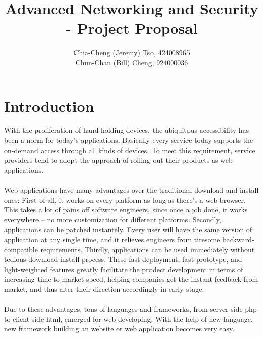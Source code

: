 \documentclass[12pt, a4paper]{article}
\title{
    Advanced Networking and Security\\
    - Project Proposal
    \vspace{-2ex}
}
\author{
    \normalfont \normalsize 
    Chia-Cheng (Jeremy) Tso, 
    424008965\\
    \vspace{-5ex}
    \normalfont \normalsize 
    Chun-Chan (Bill) Cheng, 
    924000036
    \vspace{-5ex}
}
\date{
    \normalfont \normalsize 
    \vspace{-9ex}
}
\begin{document}
\maketitle
%

\section{Introduction}
With the proliferation of hand-holding devices,
the ubiquitous accessibility has been a norm for today's applications.
Basically every service today supports the on-demand access through all kinds of devices.
To meet this requirement, service providers tend to adopt the approach of rolling
out their products as
web applications.
\\\\
Web applications have many advantages over the traditional download-and-install ones:
First of all, it works on every platform as long as there's a web browser.
This takes a lot of pains off software engineers, since once a job done, it works everywhere
-- no more customization for different platforms.  %
Secondly, applications can be patched instantely.
Every user will have the same version of application at any single time,
and it relieves engineers from
tiresome backward-compatible requirements.
Thirdly,
applications can be used immediately without tedious download-install process.
These fast deployment, fast prototype, and light-weighted features
greatly facilitate the prodect development in terms of
increasing time-to-market speed,
helping companies get the instant
feedback from market, and thus alter their direction accordingly in early stage.
\\\\
Due to these advantages, tons of languages and frameworks, from server side php
to client side html, emerged for web developing. With the help of new language,
new framework building an website or web application becomes very easy.
\end{document}

